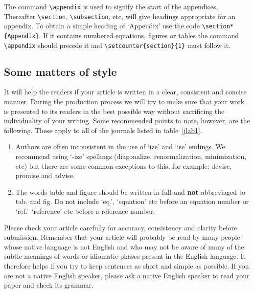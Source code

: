 \documentclass[12pt]{iopart}
\begin{document}
The command \verb"\appendix" is used to signify the start of the
appendices. Thereafter \verb"\section", \verb"\subsection", etc, will 
give headings appropriate for an appendix. To obtain a simple heading of 
`Appendix' use the code \verb"\section*{Appendix}". If it contains
numbered equations, figures or tables the command \verb"\appendix" should
precede it and \verb"\setcounter{section}{1}" must follow it. 
 
\subsection{Some matters of style}
It will help the readers if your article is written in a clear,
consistent and concise manner. During the production process
we will try to make sure that your work is presented to its
readers in the best possible way without sacrificing the individuality of
your writing. Some recommended 
points to note, however, are the following.  These apply to all of the journals listed
in table~\ref{jlab1}.
\begin{enumerate}
\item Authors are often inconsistent in the use of `ize' and `ise' endings.
We recommend using `-ize' spellings (diagonalize, 
renormalization, minimization, etc) but there are some common 
exceptions to this, for example: devise, 
promise and advise.

\item The words table and figure should be written 
in full and {\bf not} abbreviaged to tab. and fig. Do not include `eq.', `equation' etc before an equation number or `ref.'\, `reference' etc before a reference number.
\end{enumerate}

Please check your article carefully for accuracy, consistency and clarity before
submission. Remember that your article will probably be read by many
people whose native language is not English and who may not  
be aware of many of the subtle meanings of words or idiomatic phases
present in the English language. It therefore helps if you try to keep
sentences as short and simple as possible.  If you are not a native English speaker,
please ask a native English speaker to read your paper and check its grammar.
\end{document}
